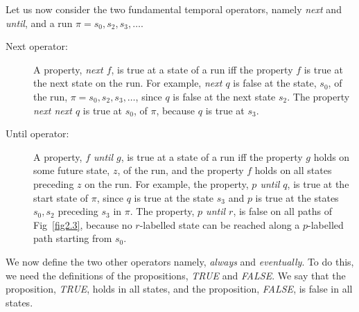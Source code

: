 \noindent
Let us now consider the two fundamental temporal operators, namely {\em next}
and {\em until}, and a run $\pi = s_0, s_2, s_3, \ldots$.
\begin{description}

\item[Next operator: ]  A property, 
	{\em next $f$}, is true at a state
	of a run iff the property $f$ is true at the next state on the run.
	For example, {\em next $q$} is false at the state, $s_0$, of the run,
	$\pi = s_0, s_2, s_3, \ldots$, since $q$ is false at the next state
	$s_2$. The property {\em next next $q$} is true at $s_0$,
	of $\pi$, because $q$ is true at $s_3$.

\item[Until operator: ] 
	A property, {\em $f$ until $g$}, is true at a
	state of a run iff the property $g$ holds on some future state, $z$,
	of the run, and the property $f$ holds on all states preceding $z$
	on the run. For example, the property, {\em $p$ until $q$}, is true
	at the start state of $\pi$, since $q$ is true at the state $s_3$
	and $p$ is true at the states $s_0, s_2$ preceding $s_3$ in $\pi$.
	The property, {\em $p$ until $r$}, is false on all paths of 
	Fig~\ref{fig2.3}, because no $r$-labelled state can be reached along
	a $p$-labelled path starting from $s_0$.

\end{description}
We now define the two other operators  
namely, {\em always} and {\em eventually}. To do this, we need the definitions
of the propositions, {\em TRUE} and {\em FALSE}. We say that the proposition,
{\em TRUE}, holds in all states, and the proposition, {\em FALSE}, is false
in all states.
